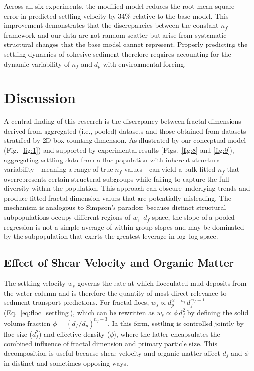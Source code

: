 \documentclass{agujournal2019}
\begin{document}
Across all six experiments, the modified model reduces the root-mean-square error in predicted settling velocity by 34\% relative to the base model. This improvement demonstrates that the discrepancies between the constant-$n_f$ framework and our data are not random scatter but arise from systematic structural changes that the base model cannot represent. Properly predicting the settling dynamics of cohesive sediment therefore requires accounting for the dynamic variability of $n_f$ and $d_p$ with environmental forcing.

\section{Discussion}

A central finding of this research is the discrepancy between fractal dimensions derived from aggregated (i.e., pooled) datasets and those obtained from datasets stratified by 2D box-counting dimension. As illustrated by our conceptual model (Fig.~\ref{fig:1}) and supported by experimental results (Figs.~\ref{fig:8} and \ref{fig:9}), aggregating settling data from a floc population with inherent structural variability---meaning a range of true $n_f$ values---can yield a bulk-fitted $n_f$ that overrepresents certain structural subgroups while failing to capture the full diversity within the population. This approach can obscure underlying trends and produce fitted fractal-dimension values that are potentially misleading. The mechanism is analogous to Simpson’s paradox: because distinct structural subpopulations occupy different regions of $w_s$--$d_f$ space, the slope of a pooled regression is not a simple average of within-group slopes and may be dominated by the subpopulation that exerts the greatest leverage in log--log space.

\subsection{Effect of Shear Velocity and Organic Matter}
The settling velocity $w_s$ governs the rate at which flocculated mud deposits from the water column and is therefore the quantity of most direct relevance to sediment transport predictions. For fractal flocs, $w_s \propto d_p^{\,3-n_f}\, d_f^{\,n_f-1}$ (Eq.~\eqref{eq:floc_settling}), which can be rewritten as $w_s \propto \phi \, d_f^2$ by defining the solid volume fraction $\phi = (d_f / d_p)^{n_f - 3}$. In this form, settling is controlled jointly by floc size ($d_f^2$) and effective density ($\phi$), where the latter encapsulates the combined influence of fractal dimension and primary particle size. This decomposition is useful because shear velocity and organic matter affect $d_f$ and $\phi$ in distinct and sometimes opposing ways.
\end{document}
